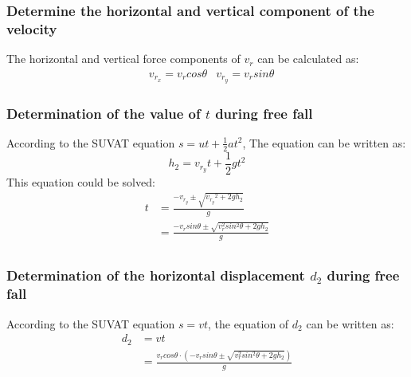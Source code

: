 \documentclass{article}
\begin{document}
        \subsubsection{Determine the horizontal and vertical component of the velocity}
            The horizontal and vertical force components of $v_r$ can be calculated as:
            \begin{equation}
                \begin{aligned}
                &v_{r_x} = v_rcos\theta  &v_{r_y} = v_rsin\theta
                \end{aligned}
            \end{equation}
        \subsubsection{Determination of the value of $t$ during free fall}
            According to the SUVAT equation $s = ut +\frac{1}{2}at^2$, The equation can be written as:
            \begin{equation}
                h_2 = v_{r_y}t + \frac{1}{2}gt^2 \nonumber
            \end{equation}
            This equation could be solved:
            \begin{equation}
                \begin{aligned}
                    t &= \frac{-v_{r_y}\pm\sqrt{{v_{r_y}}^2+2gh_2}}{g}\\
                      &= \frac{-v_{r}sin\theta\pm\sqrt{{v^2_{r}sin^2\theta}+2gh_2}}{g}\\
                \end{aligned}
            \end{equation}
        \subsubsection{Determination of the horizontal displacement $d_2$ during free fall }
            According to the SUVAT equation $s = vt$, the equation of $d_2$ can be written as:
                \begin{equation}
                    \begin{aligned}
                        d_2 &= vt
                        \\ &= \frac{v_rcos\theta \cdot (-v_{r}sin\theta\pm\sqrt{{v^2_{r}sin^2\theta}+2gh_2})}{g}
                    \end{aligned}
                \end{equation}
\end{document}
